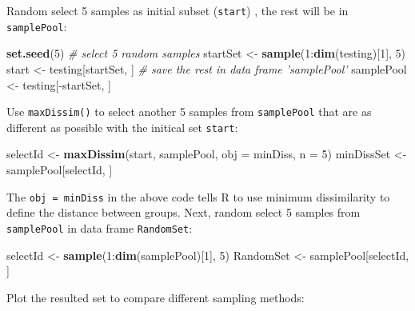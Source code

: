 \documentclass[12pt,]{krantz}
\newenvironment{Shaded}{\begin{snugshade}}{\end{snugshade}}
\newcommand{\KeywordTok}[1]{\textcolor[rgb]{0.13,0.29,0.53}{\textbf{{#1}}}}
\newcommand{\DataTypeTok}[1]{\textcolor[rgb]{0.13,0.29,0.53}{{#1}}}
\newcommand{\DecValTok}[1]{\textcolor[rgb]{0.00,0.00,0.81}{{#1}}}
\newcommand{\StringTok}[1]{\textcolor[rgb]{0.31,0.60,0.02}{{#1}}}
\newcommand{\CommentTok}[1]{\textcolor[rgb]{0.56,0.35,0.01}{\textit{{#1}}}}
\newcommand{\NormalTok}[1]{{#1}}
\theoremstyle{definition}
\theoremstyle{definition}
\theoremstyle{remark}
\begin{document}
Random select 5 samples as initial subset (\texttt{start}) , the rest
will be in \texttt{samplePool}:

\begin{Shaded}
\begin{Highlighting}[]
\KeywordTok{set.seed}\NormalTok{(}\DecValTok{5}\NormalTok{)}
\CommentTok{# select 5 random samples}
\NormalTok{startSet <-}\StringTok{ }\KeywordTok{sample}\NormalTok{(}\DecValTok{1}\NormalTok{:}\KeywordTok{dim}\NormalTok{(testing)[}\DecValTok{1}\NormalTok{], }\DecValTok{5}\NormalTok{)}
\NormalTok{start <-}\StringTok{ }\NormalTok{testing[startSet, ]}
\CommentTok{# save the rest in data frame 'samplePool'}
\NormalTok{samplePool <-}\StringTok{ }\NormalTok{testing[-startSet, ]}
\end{Highlighting}
\end{Shaded}

Use \texttt{maxDissim()} to select another 5 samples from
\texttt{samplePool} that are as different as possible with the initical
set \texttt{start}:

\begin{Shaded}
\begin{Highlighting}[]
\NormalTok{selectId <-}\StringTok{ }\KeywordTok{maxDissim}\NormalTok{(start, samplePool, }\DataTypeTok{obj =} \NormalTok{minDiss, }\DataTypeTok{n =} \DecValTok{5}\NormalTok{)}
\NormalTok{minDissSet <-}\StringTok{ }\NormalTok{samplePool[selectId, ]}
\end{Highlighting}
\end{Shaded}

The \texttt{obj\ =\ minDiss} in the above code tells R to use minimum
dissimilarity to define the distance between groups. Next, random select
5 samples from \texttt{samplePool} in data frame \texttt{RandomSet}:

\begin{Shaded}
\begin{Highlighting}[]
\NormalTok{selectId <-}\StringTok{ }\KeywordTok{sample}\NormalTok{(}\DecValTok{1}\NormalTok{:}\KeywordTok{dim}\NormalTok{(samplePool)[}\DecValTok{1}\NormalTok{], }\DecValTok{5}\NormalTok{)}
\NormalTok{RandomSet <-}\StringTok{ }\NormalTok{samplePool[selectId, ]}
\end{Highlighting}
\end{Shaded}

Plot the resulted set to compare different sampling methods:
\end{document}
